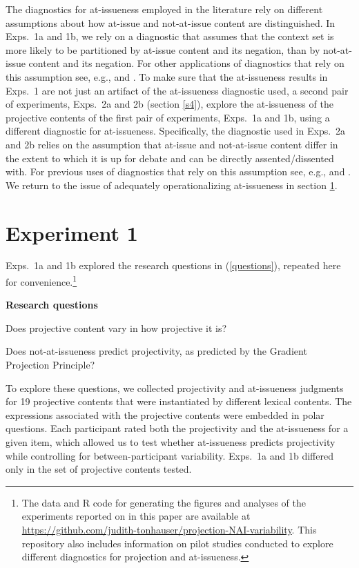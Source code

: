 \documentclass[11pt,fleqn]{article}
\newcommand{\6}{\mbox{$[\hspace*{-.6mm}[$}}
\newcommand{\9}{\mbox{$]\hspace*{-.6mm}]$}}
\begin{document}
The diagnostics for at-issueness employed in the literature rely on different assumptions about how at-issue and not-at-issue content are distinguished. In Exps.~1a and 1b, we rely on a diagnostic that assumes that the context set is more likely to be partitioned by at-issue content and its negation, than by not-at-issue content and its negation. For other applications of diagnostics that rely on this assumption see, e.g., \citealt{amaral-etal07} and \citealt{tonhauser-sula6}. To make sure that the at-issueness results in Exps.~1 are not just an artifact of the at-issueness diagnostic used, a second pair of experiments, Exps.~2a and 2b (section \ref{s4}), explore the at-issueness of the projective contents of the first pair of experiments, Exps.~1a and 1b, using a different diagnostic for at-issueness. Specifically, the diagnostic used in Exps.~2a and 2b relies on the assumption that at-issue and not-at-issue content differ in the extent to which it is up for debate and can be directly assented/dissented with. For previous uses of diagnostics that rely on this assumption see, e.g., \citealt{amaral-etal07,xue-onea11,murray2014,anderbois-etal2015,destruel-etal2015,tonhauser-sula6} and \citealt{syrett-koev2015}. We return to the issue of adequately operationalizing at-issueness in section \ref{s3}.

\section{Experiment 1}
\label{s3}

Exps.~1a and 1b explored the research questions in (\ref{questions}), repeated here for convenience.\footnote{\label{f-github}The
data and R code for generating the figures and analyses
of the experiments reported on in this paper are available at \url{https://github.com/judith-tonhauser/projection-NAI-variability}. This repository also includes information on pilot studies conducted to explore different diagnostics for projection and at-issueness.}

\begin{exe}
\exi{(\ref{questions})} {\bf Research questions}

\begin{xlist} 

\ex Does projective content vary in how projective it is?

\ex Does not-at-issueness predict projectivity, as predicted by the Gradient Projection Principle?

\end{xlist}

\end{exe} 
To explore these questions, we collected projectivity and at-issueness judgments for 19  projective contents that were instantiated by different lexical contents. The expressions associated with the projective contents were embedded in polar questions. Each participant rated both the projectivity and the at-issueness for a given item, which allowed us to test whether at-issueness predicts projectivity while controlling for between-participant variability. Exps.~1a and 1b differed only in the set of projective contents tested. 
\end{document}

